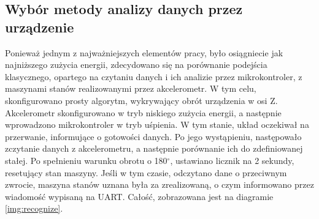\subsection{Wybór metody analizy danych przez urządzenie}
\label{sub:recognize-choice}
Ponieważ jednym z najważniejszych elementów pracy, było osiągniecie jak najniższego zużycia energii, zdecydowano się na porównanie podejścia klasycznego, opartego na czytaniu danych i ich analizie przez mikrokontroler, z maszynami stanów realizowanymi przez akcelerometr. W tym celu, skonfigurowano prosty algorytm, wykrywający obrót urządzenia w osi Z. Akcelerometr skonfigurowano w tryb niskiego zużycia energii, a następnie wprowadzono mikrokontroler w tryb uśpienia. W tym stanie, układ oczekiwał na przerwanie, informujące o gotowości danych. Po jego wystąpieniu, następowało zczytanie danych z akcelerometru, a następnie porównanie ich do zdefiniowanej stałej. Po spełnieniu warunku obrotu o 180$^{\circ}$, ustawiano licznik na 2 sekundy, resetujący stan maszyny. Jeśli w tym czasie, odczytano dane o przeciwnym zwrocie, maszyna stanów uznana była za zrealizowaną, o czym informowano przez wiadomość wypisaną na UART. Całość, zobrazowana jest na diagramie \ref{img:recognize}.

